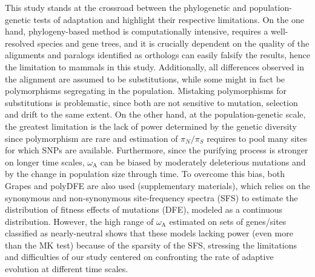 \documentclass{article}
\newcommand{\pn}{\pi_N}
\newcommand{\ps}{\pi_S}
\newcommand{\pnps}{\pn / \ps}
\begin{document}
This study stands at the crossroad between the phylogenetic and population-genetic tests of adaptation and highlight their respective limitations.
On the one hand, phylogeny-based method is computationally intensive, requires a well-resolved species and gene trees, and it is crucially dependent on the quality of the alignments and paralogs identified as orthologs can easily falsify the results, hence the limitation to mammals in this study.
Additionally, all differences observed in the alignment are assumed to be substitutions, while some might in fact be polymorphisms segregating in the population.
Mistaking polymorphisms for substitutions is problematic, since both are not sensitive to mutation, selection and drift to the same extent\cite{mugal_why_2014}.
On the other hand, at the population-genetic scale, the greatest limitation is the lack of power determined by the genetic diversity since polymorphism are rare and estimation of $\pnps$ requires to pool many sites for which SNPs are available.
Furthermore, since the purifying process is stronger on longer time scales, $\omega_{\mathrm{A}}$ can be biased by moderately deleterious mutations\cite{eyre-walker_quantifying_2002, ho_time_2005} and by the change in population size through time\cite{eyre-walker_changing_2002}.
To overcome this bias, both Grapes\cite{galtier_adaptive_2016} and polyDFE\cite{tataru_polydfe_2020} are also used (supplementary materials), which relies on the synonymous and non-synonymous site-frequency spectra (SFS) to estimate the distribution of fitness effects of mutations (DFE), modeled as a continuous distribution.
However, the high range of $\omega_{\mathrm{A}}$ estimated on sets of genes/sites classified as nearly-neutral shows that these models lacking power (even more than the MK test) because of the sparsity of the SFS, stressing the limitations and difficulties of our study centered on confronting the rate of adaptive evolution at different time scales.
\end{document}
